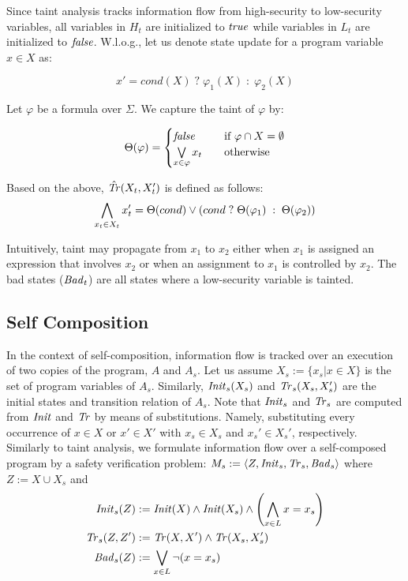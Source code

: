 Since taint analysis tracks information flow from high-security to low-security variables, all variables in $H_t$ are initialized to $\mathit{true}$ while variables in $L_t$ are initialized to $\mathit{false}$. W.l.o.g., let us denote state update for a program variable $x\in X$ as:

$$x' = cond(X) \; ? \; \varphi_1(X)\; :\; \varphi_2(X)$$

Let $\varphi$ be a formula over $\Sigma$. We capture the taint of $\varphi$ by:

\[ \Theta(\varphi) =
  \begin{cases}
    \mathit{false}       & \quad \text{if } \varphi\cap X = \emptyset\\
    \bigvee\limits_{x\in \varphi} x_t  & \quad \text{otherwise}
  \end{cases}
\]

Based on the above, $\hat{\mathit{Tr}}(X_t,X_t')$ is defined as follows:
$$ \bigwedge\limits_{x_t\in X_t} x_t' = \Theta(cond)\lor \left( cond\; ? \; \Theta(\varphi_1) \; : \; \Theta(\varphi_2) \right)$$


Intuitively, taint may propagate from $x_1$ to $x_2$ either when $x_1$ is assigned an expression that involves $x_2$ or when an assignment to $x_1$ is controlled by $x_2$. The bad states ($\mathit{Bad}_t$) are all states where a low-security variable is tainted.

\subsection{Self Composition} \label{self-composition}
In the context of self-composition, information flow is tracked over an execution of two copies of the program, $A$ and $A_s$. Let us assume $X_s := \{x_s | x\in X\}$ is the set of program variables of $A_s$. Similarly, $\mathit{Init}_s(X_s)$ and $\mathit{Tr}_s(X_s,X_s')$ are the initial states and transition relation of $A_s$. Note that $\mathit{Init}_s$ and $\mathit{Tr}_s$ are computed from $\mathit{Init}$ and $\mathit{Tr}$ by means of substitutions. Namely, substituting every occurrence of $x\in X$ or $x'\in X'$ with $x_s\in X_s$ and $x_s'\in X_s'$, respectively. Similarly to taint analysis, we formulate information flow over a self-composed program by a safety verification problem: $M_s := \langle Z, \mathit{Init}_s,\mathit{Tr}_s,\mathit{Bad}_s\rangle$ where $Z := X\cup X_s$ and  
\begin{align}
    \mathit{Init}_s(Z) & := \mathit{Init}(X)\land\mathit{Init}(X_s)\land\left(\bigwedge\limits_{x\in L} x = x_s\right)\\
    \mathit{Tr}_s(Z,Z') &:= \mathit{Tr}(X,X')\land\mathit{Tr}(X_s,X_s')\\
    \mathit{Bad}_s(Z) &:= \bigvee\limits_{x\in L} \neg(x = x_s)
\end{align} 

